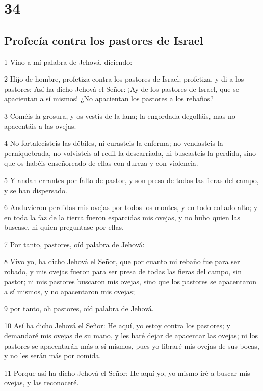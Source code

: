\chapter{34}

\section*{Profecía contra los pastores de Israel }

\par 1 Vino a mí palabra de Jehová, diciendo:
\par 2 Hijo de hombre, profetiza contra los pastores de Israel; profetiza, y di a los pastores: Así ha dicho Jehová el Señor: ¡Ay de los pastores de Israel, que se apacientan a sí mismos! ¿No apacientan los pastores a los rebaños?
\par 3 Coméis la grosura, y os vestís de la lana; la engordada degolláis, mas no apacentáis a las ovejas.
\par 4 No fortalecisteis las débiles, ni curasteis la enferma; no vendasteis la perniquebrada, no volvisteis al redil la descarriada, ni buscasteis la perdida, sino que os habéis enseñoreado de ellas con dureza y con violencia.
\par 5 Y andan errantes por falta de pastor, y son presa de todas las fieras del campo, y se han dispersado.
\par 6 Anduvieron perdidas mis ovejas por todos los montes, y en todo collado alto; y en toda la faz de la tierra fueron esparcidas mis ovejas, y no hubo quien las buscase, ni quien preguntase por ellas.
\par 7 Por tanto, pastores, oíd palabra de Jehová:
\par 8 Vivo yo, ha dicho Jehová el Señor, que por cuanto mi rebaño fue para ser robado, y mis ovejas fueron para ser presa de todas las fieras del campo, sin pastor; ni mis pastores buscaron mis ovejas, sino que los pastores se apacentaron a sí mismos, y no apacentaron mis ovejas;
\par 9 por tanto, oh pastores, oíd palabra de Jehová.
\par 10 Así ha dicho Jehová el Señor: He aquí, yo estoy contra los pastores; y demandaré mis ovejas de su mano, y les haré dejar de apacentar las ovejas; ni los pastores se apacentarán más a sí mismos, pues yo libraré mis ovejas de sus bocas, y no les serán más por comida.
\par 11 Porque así ha dicho Jehová el Señor: He aquí yo, yo mismo iré a buscar mis ovejas, y las reconoceré.
